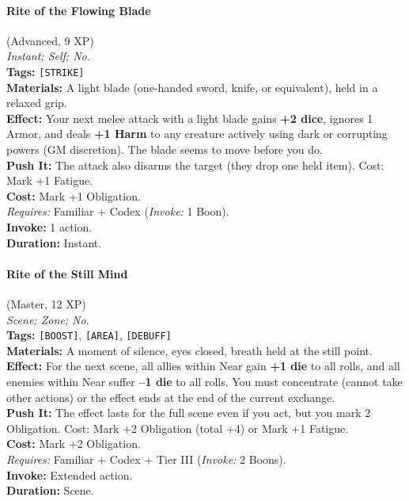 \paragraph{Rite of the Flowing Blade} (Advanced, 9 XP) \hfill \\
\emph{Instant; Self; No.} \\
\textbf{Tags:} \texttt{[STRIKE]} \\
\textbf{Materials:} A light blade (one-handed sword, knife, or equivalent), held in a relaxed grip. \\
\textbf{Effect:} Your next melee attack with a light blade gains \textbf{+2 dice}, ignores 1 Armor, and deals \textbf{+1 Harm} to any creature actively using dark or corrupting powers (GM discretion). The blade seems to move before you do. \\
\textbf{Push It:} The attack also disarms the target (they drop one held item). Cost: Mark +1 Fatigue. \\
\textbf{Cost:} Mark +1 Obligation. \\
\textit{Requires:} Familiar + Codex (\textit{Invoke:} 1 Boon). \\
\textbf{Invoke:} 1 action. \\
\textbf{Duration:} Instant.

\paragraph{Rite of the Still Mind} (Master, 12 XP) \hfill \\
\emph{Scene; Zone; No.} \\
\textbf{Tags:} \texttt{[BOOST]}, \texttt{[AREA]}, \texttt{[DEBUFF]} \\
\textbf{Materials:} A moment of silence, eyes closed, breath held at the still point. \\
\textbf{Effect:} For the next scene, all allies within Near gain \textbf{+1 die} to all rolls, and all enemies within Near suffer \textbf{--1 die} to all rolls. You must concentrate (cannot take other actions) or the effect ends at the end of the current exchange. \\
\textbf{Push It:} The effect lasts for the full scene even if you act, but you mark 2 Obligation. Cost: Mark +2 Obligation (total +4) or Mark +1 Fatigue. \\
\textbf{Cost:} Mark +2 Obligation. \\
\textit{Requires:} Familiar + Codex + Tier III (\textit{Invoke:} 2 Boons). \\
\textbf{Invoke:} Extended action. \\
\textbf{Duration:} Scene.

